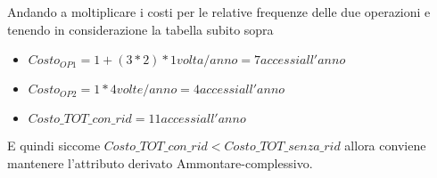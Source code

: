 Andando a moltiplicare i costi per le relative frequenze delle due operazioni e tenendo in considerazione la tabella subito sopra

\begin{samepage}
	\begin{itemize}
		\item $Costo_{OP1} = 1 + (3 * 2) * 1 volta/anno = 7 accessi all'anno$
		\item $Costo_{OP2} = 1 * 4 volte/anno = 4 accessi all'anno$
		\item $Costo\_TOT\_con\_rid = 11 accessi all'anno$
	\end{itemize}
\end{samepage}

E quindi siccome $Costo\_TOT\_con\_rid < Costo\_TOT\_senza\_rid$ allora conviene mantenere l'attributo derivato Ammontare-complessivo.